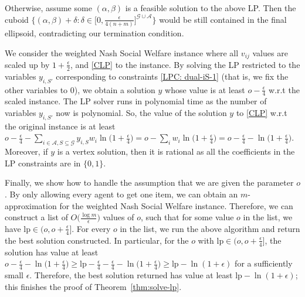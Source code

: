 \documentclass{theoretics}
\newcommand\calA{{\mathcal{A}}}
\newcommand\calG{{\mathcal{G}}}
\newcommand{\lp}{\mathrm{lp}}
\begin{document}
    Otherwise, assume some $(\alpha, \beta)$ is a feasible solution to the above LP. Then the cuboid $\Big\{(\alpha, \beta) + \delta : \delta \in \big[0, \frac{\epsilon}{4(n+m)}\big]^{\calG \cup \calA}\Big\}$ would be still contained in the final ellipsoid, contradicting our termination condition. 

    
    We consider the weighted Nash Social Welfare instance where all $v_{ij}$ values are scaled up by $1+\frac\epsilon 2$, and \eqref{CLP} to the instance. By solving the LP restricted to the variables $y_{i, S'}$ corresponding to constraints \eqref{LPC: dual-iS-1} (that is, we fix the other variables to $0$), we obtain a solution $y$ whose value is at least $o - \frac\epsilon 4$ w.r.t the scaled instance. The LP solver runs in polynomial time as the number of variables $y_{i, S'}$ now is polynomial.  So, the value of the solution $y$ to \eqref{CLP} w.r.t the original instance is at least $o - \frac\epsilon 4 - \sum_{i \in \calA, S \subseteq \calG} y_{i, S}w_i\ln\big(1+\frac\epsilon 4\big) = o - \sum_{i} w_i\ln\big(1+\frac\epsilon 4\big) = o - \frac\epsilon 4- \ln\big(1+\frac\epsilon 4\big)$. Moreover, if $y$ is a vertex solution, then it is rational as all the coefficients in the LP constraints are in $\{0, 1\}$.  


    Finally, we show how to handle the assumption that we are given the parameter $o$. By only allowing every agent to get one item, we can obtain an $m$-approximation for the weighted Nash Social Welfare instance. Therefore, we can construct a list of $O\Big(\frac{\log m}{\epsilon}\Big)$ values of $o$, such that for some value $o$ in the list, we have $\lp \in (o, o + \frac\epsilon 4]$. For every $o$ in the list, we run the above algorithm and return the best solution constructed. In particular, for the $o$ with $\lp \in (o, o + \frac\epsilon 4]$, the solution has value at least $o - \frac\epsilon 4 - \ln\big(1+\frac\epsilon 4\big) \geq \lp - \frac\epsilon 4 - \frac\epsilon 4 - \ln\big(1+\frac\epsilon 4\big) \geq \lp - \ln(1+\epsilon)$ for a sufficiently small $\epsilon$. Therefore, the best solution returned has value at least $\lp - \ln(1+\epsilon)$; this finishes the proof of Theorem~\ref{thm:solve-lp}.

 


\printbibliography
\end{document}
